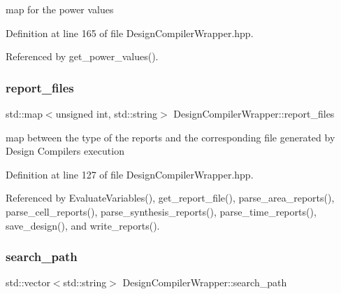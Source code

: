 map for the power values 



Definition at line 165 of file Design\+Compiler\+Wrapper.\+hpp.



Referenced by get\+\_\+power\+\_\+values().

\mbox{\label{classDesignCompilerWrapper_aa7cff31353dc0ff6f0dc53ab35cda472}} 
\subsubsection{\texorpdfstring{report\+\_\+files}{report\_files}}
{\footnotesize\ttfamily std\+::map$<$unsigned int, std\+::string$>$ Design\+Compiler\+Wrapper\+::report\+\_\+files\hspace{0.3cm}{\ttfamily [protected]}}



map between the type of the reports and the corresponding file generated by Design Compiler\textquotesingle{}s execution 



Definition at line 127 of file Design\+Compiler\+Wrapper.\+hpp.



Referenced by Evaluate\+Variables(), get\+\_\+report\+\_\+file(), parse\+\_\+area\+\_\+reports(), parse\+\_\+cell\+\_\+reports(), parse\+\_\+synthesis\+\_\+reports(), parse\+\_\+time\+\_\+reports(), save\+\_\+design(), and write\+\_\+reports().

\mbox{\label{classDesignCompilerWrapper_a21bd3539fc18d671160efdb82457bb2b}} 
\subsubsection{\texorpdfstring{search\+\_\+path}{search\_path}}
{\footnotesize\ttfamily std\+::vector$<$std\+::string$>$ Design\+Compiler\+Wrapper\+::search\+\_\+path\hspace{0.3cm}{\ttfamily [protected]}}



